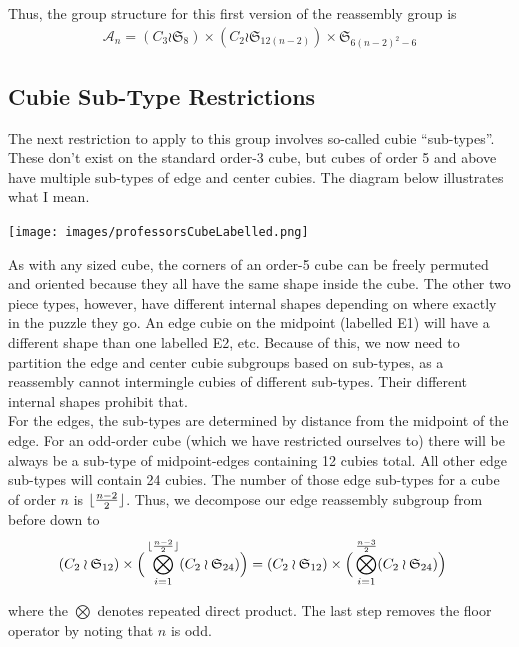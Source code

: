 \documentclass[10pt,letterpaper]{report}
\DeclarePairedDelimiter\floor{\lfloor}{\rfloor}
\begin{document}
Thus, the group structure for this first version of the reassembly group is\begin{align*}
\mathcal{A}_n = (C_3 \wr \mathfrak{S}_8) \times (C_2 \wr \mathfrak{S}_{12(n-2)}) \times \mathfrak{S}_{6(n-2)^2 - 6}
\end{align*}

\subsection{Cubie Sub-Type Restrictions}
The next restriction to apply to this group involves so-called cubie ``sub-types''.  These don't exist on the standard order-3 cube, but cubes of order 5 and above have multiple sub-types of edge and center cubies.  The diagram below illustrates what I mean.

\begin{center}
\texttt{[image: images/professorsCubeLabelled.png]} 
\end{center}

As with any sized cube, the corners of an order-5 cube can be freely permuted and oriented because they all have the same shape inside the cube.  The other two piece types, however, have different internal shapes depending on where exactly in the puzzle they go.  An edge cubie on the midpoint (labelled E1) will have a different shape than one labelled E2, etc.  Because of this, we now need to partition the edge and center cubie subgroups based on sub-types, as a reassembly cannot intermingle cubies of different sub-types.  Their different internal shapes prohibit that. \\

For the edges, the sub-types are determined by distance from the midpoint of the edge.  For an odd-order cube (which we have restricted ourselves to) there will be always be a sub-type of midpoint-edges containing 12 cubies total.  All other edge sub-types will contain 24 cubies.  The number of those edge sub-types for a cube of order $n$ is $\floor{\frac{n-2}{2}}$.  Thus, we decompose our edge reassembly subgroup from before down to \begin{align*}
(C_2 \wr \mathfrak{S}_{12}) \times \Big( \bigotimes_{i=1}^{\floor{\frac{n-2}{2}}} (C_2 \wr \mathfrak{S}_{24}) \Big)
&= (C_2 \wr \mathfrak{S}_{12}) \times \Big( \bigotimes_{i=1}^{\frac{n-3}{2}} (C_2 \wr \mathfrak{S}_{24}) \Big)
\end{align*}

where the $\bigotimes$ denotes repeated direct product.  The last step removes the floor operator by noting that $n$ is odd. \\
\end{document}
